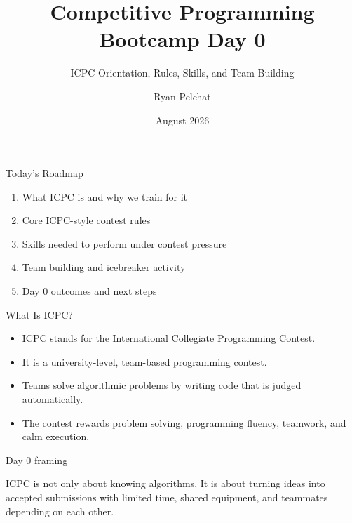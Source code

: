 \documentclass[aspectratio=169,11pt]{beamer}
\title[CP Bootcamp]{Competitive Programming Bootcamp Day 0}
\subtitle{ICPC Orientation, Rules, Skills, and Team Building}
\author[Ryan Pelchat]{Ryan Pelchat}
\date{August 2026}
\newenvironment{cpbox}[1]{%
  \begin{block}{#1}
  }{%
  \end{block}
}
\begin{document}
\begin{frame}[plain]
  \titlepage
\end{frame}

\begin{frame}{Today's Roadmap}
  \begin{enumerate}
    \item What ICPC is and why we train for it
    \item Core ICPC-style contest rules
    \item Skills needed to perform under contest pressure
    \item Team building and icebreaker activity
    \item Day 0 outcomes and next steps
  \end{enumerate}
\end{frame}

\begin{frame}{What Is ICPC?}
  \begin{itemize}
    \item ICPC stands for the International Collegiate Programming Contest.
    \item It is a university-level, team-based programming contest.
    \item Teams solve algorithmic problems by writing code that is judged automatically.
    \item The contest rewards problem solving, programming fluency, teamwork, and calm execution.
  \end{itemize}

  \vspace{0.35cm}
  \begin{cpbox}{Day 0 framing}
    ICPC is not only about knowing algorithms. It is about turning ideas into accepted submissions with limited time, shared equipment, and teammates depending on each other.
  \end{cpbox}
\end{frame}
\end{document}

